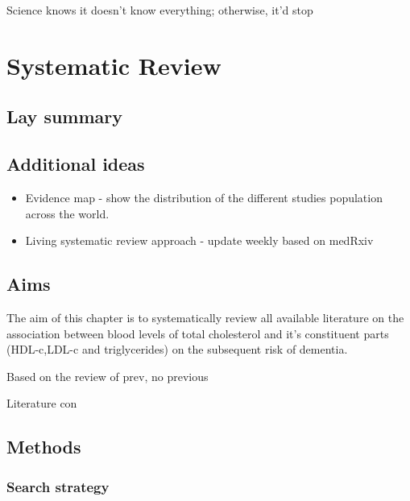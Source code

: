 \documentclass[a4paper, twoside]{templates/ociamthesis}
\providecommand{\tightlist}{%
  \setlength{\itemsep}{0pt}\setlength{\parskip}{0pt}}
\begin{document}
\begin{savequote}
Science knows it doesn't know everything; otherwise, it'd stop
\end{savequote}

\hypertarget{sys-rev-heading}{%
\chapter{Systematic Review}\label{sys-rev-heading}}

\minitoc 

\hypertarget{lay-summary-1}{%
\section{Lay summary}\label{lay-summary-1}}

\hypertarget{additional-ideas-1}{%
\section{Additional ideas}\label{additional-ideas-1}}

\begin{itemize}
\tightlist
\item
  Evidence map - show the distribution of the different studies population across the world.
\item
  Living systematic review approach - update weekly based on medRxiv
\end{itemize}

\hypertarget{aims}{%
\section{Aims}\label{aims}}

The aim of this chapter is to systematically review all available literature on the association between blood levels of total cholesterol and it's constituent parts (HDL-c,LDL-c and triglycerides) on the subsequent risk of dementia.

Based on the review of prev, no previous

Literature con

\hypertarget{methods}{%
\section{Methods}\label{methods}}

\hypertarget{search-strategy}{%
\subsection{Search strategy}\label{search-strategy}}
\end{document}
